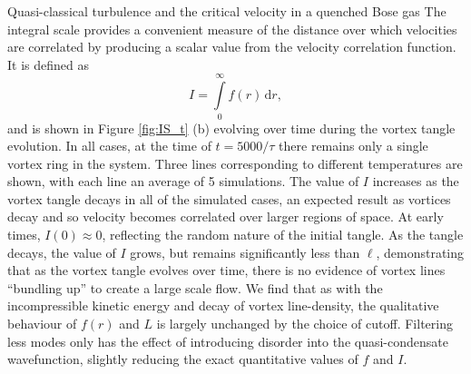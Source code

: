 \begin{chapter}{\label{cha:nonequib}Quasi-classical turbulence and the critical velocity in a quenched Bose gas}
The integral scale provides a convenient measure of the distance over which velocities are correlated by producing a scalar value from the velocity correlation function. It is defined as
\begin{equation}
I = \int\limits_0^\infty\! f(r)\, \mathrm{d}r,
\end{equation}
and is shown in Figure \ref{fig:IS_t} (b) evolving over time during the vortex tangle evolution. In all cases, at the time of $t=5000/\tau$ there remains only a single vortex ring in the system. Three lines corresponding to different temperatures are shown, with each line an average of 5 simulations. The value of $I$ increases as the vortex tangle decays in all of the simulated cases, an expected result as vortices decay and so velocity becomes correlated over larger regions of space. At early times, $I(0)\approx0$, reflecting the random nature of the initial tangle. As the tangle decays, the value of $I$ grows, but remains significantly less than $\ell$, demonstrating that as the vortex tangle evolves over time, there is no evidence of vortex lines ``bundling up'' to create a large scale flow. We find that as with the incompressible kinetic energy and decay of vortex line-density, the qualitative behaviour of $f(r)$ and $L$ is largely unchanged by the choice of cutoff. Filtering less modes only has the effect of introducing disorder into the quasi-condensate wavefunction, slightly reducing the exact quantitative values of $f$ and $I$. 


\end{chapter}
